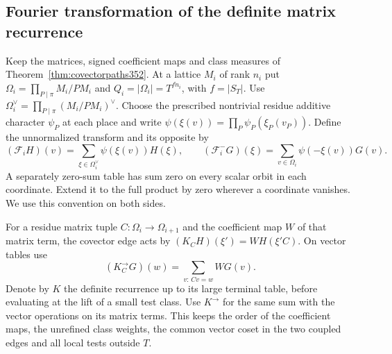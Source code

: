 \documentclass[a4paper,11pt]{article}
\theoremstyle{definition}
\theoremstyle{remark}
\numberwithin{equation}{section}
\begin{document}
\subsection{Fourier transformation of the definite matrix recurrence}\label{sec:vectorchain353}

Keep the matrices, signed coefficient maps and class measures of
Theorem~\ref{thm:covectorpaths352}. At a lattice \(M_i\) of rank
\(n_i\) put \(\Omega_i=\prod_{P\mid\pi}M_i/PM_i\) and
\(Q_i=|\Omega_i|=T^{fn_i}\), with \(f=|S_T|\). Use
\(\Omega_i^\vee=\prod_{P\mid\pi}(M_i/PM_i)^\vee\).
Choose the prescribed nontrivial residue additive character
\(\psi_P\) at each place and write
\(\psi(\xi(v))=\prod_P\psi_P(\xi_P(v_P))\).
Define the unnormalized transform and its opposite by
\[
   (\mathcal F_i H)(v)=\sum_{\xi\in\Omega_i^\vee}\psi(\xi(v))H(\xi),
   \qquad
   (\mathcal F_i^-G)(\xi)=\sum_{v\in\Omega_i}\psi(-\xi(v))G(v).
\]
A separately zero-sum table has sum zero on every scalar orbit in
each coordinate. Extend it to the full product by zero wherever
a coordinate vanishes. We use this convention on both sides.

For a residue matrix tuple \(C:\Omega_i\to\Omega_{i+1}\) and
the coefficient map \(W\) of that matrix term, the covector edge
acts by \((K_C H)(\xi')=W H(\xi' C)\). On vector tables use
\[
                (K_C^\to G)(w)=\sum_{v:\,Cv=w} W G(v).
\]
Denote by \(K\) the definite recurrence up to its large terminal
table, before evaluating at the lift of a small test class.
Use \(K^\to\) for the same sum with the vector operations on
its matrix terms. This keeps the order of the coefficient maps,
the unrefined class weights, the common vector coset in the two
coupled edges and all local tests outside \(T\).
\end{document}
